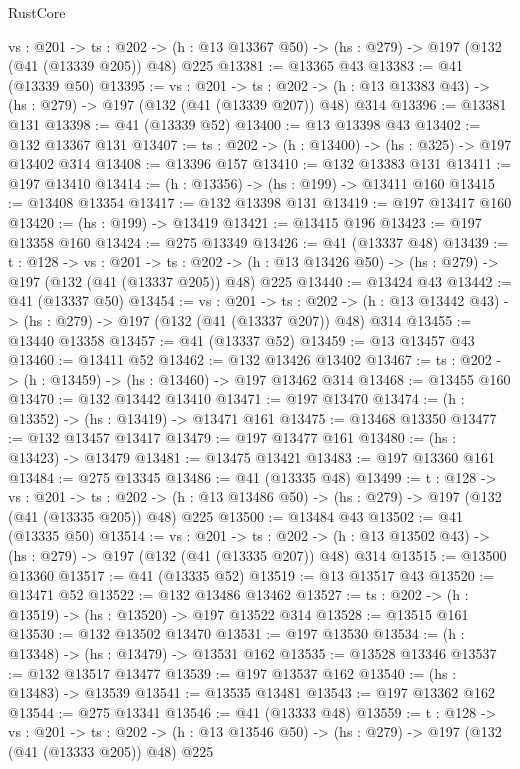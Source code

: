 \begin{lexlean}{RustCore}
\begin{coremodule}
  {vs : @201} ->
  {ts : @202} -> (h : @13 @13367 @50) -> (hs : @279) -> @197 (@132 (@41 (@13339 @205)) @48) @225
@13381 := @13365 @43
@13383 := @41 (@13339 @50)
@13395 := {vs : @201} ->
  {ts : @202} -> (h : @13 @13383 @43) -> (hs : @279) -> @197 (@132 (@41 (@13339 @207)) @48) @314
@13396 := @13381 @131
@13398 := @41 (@13339 @52)
@13400 := @13 @13398 @43
@13402 := @132 @13367 @131
@13407 := {ts : @202} -> (h : @13400) -> (hs : @325) -> @197 @13402 @314
@13408 := @13396 @157
@13410 := @132 @13383 @131
@13411 := @197 @13410
@13414 := (h : @13356) -> (hs : @199) -> @13411 @160
@13415 := @13408 @13354
@13417 := @132 @13398 @131
@13419 := @197 @13417 @160
@13420 := (hs : @199) -> @13419
@13421 := @13415 @196
@13423 := @197 @13358 @160
@13424 := @275 @13349
@13426 := @41 (@13337 @48)
@13439 := {t : @128} ->
  {vs : @201} ->
  {ts : @202} -> (h : @13 @13426 @50) -> (hs : @279) -> @197 (@132 (@41 (@13337 @205)) @48) @225
@13440 := @13424 @43
@13442 := @41 (@13337 @50)
@13454 := {vs : @201} ->
  {ts : @202} -> (h : @13 @13442 @43) -> (hs : @279) -> @197 (@132 (@41 (@13337 @207)) @48) @314
@13455 := @13440 @13358
@13457 := @41 (@13337 @52)
@13459 := @13 @13457 @43
@13460 := @13411 @52
@13462 := @132 @13426 @13402
@13467 := {ts : @202} -> (h : @13459) -> (hs : @13460) -> @197 @13462 @314
@13468 := @13455 @160
@13470 := @132 @13442 @13410
@13471 := @197 @13470
@13474 := (h : @13352) -> (hs : @13419) -> @13471 @161
@13475 := @13468 @13350
@13477 := @132 @13457 @13417
@13479 := @197 @13477 @161
@13480 := (hs : @13423) -> @13479
@13481 := @13475 @13421
@13483 := @197 @13360 @161
@13484 := @275 @13345
@13486 := @41 (@13335 @48)
@13499 := {t : @128} ->
  {vs : @201} ->
  {ts : @202} -> (h : @13 @13486 @50) -> (hs : @279) -> @197 (@132 (@41 (@13335 @205)) @48) @225
@13500 := @13484 @43
@13502 := @41 (@13335 @50)
@13514 := {vs : @201} ->
  {ts : @202} -> (h : @13 @13502 @43) -> (hs : @279) -> @197 (@132 (@41 (@13335 @207)) @48) @314
@13515 := @13500 @13360
@13517 := @41 (@13335 @52)
@13519 := @13 @13517 @43
@13520 := @13471 @52
@13522 := @132 @13486 @13462
@13527 := {ts : @202} -> (h : @13519) -> (hs : @13520) -> @197 @13522 @314
@13528 := @13515 @161
@13530 := @132 @13502 @13470
@13531 := @197 @13530
@13534 := (h : @13348) -> (hs : @13479) -> @13531 @162
@13535 := @13528 @13346
@13537 := @132 @13517 @13477
@13539 := @197 @13537 @162
@13540 := (hs : @13483) -> @13539
@13541 := @13535 @13481
@13543 := @197 @13362 @162
@13544 := @275 @13341
@13546 := @41 (@13333 @48)
@13559 := {t : @128} ->
  {vs : @201} ->
  {ts : @202} -> (h : @13 @13546 @50) -> (hs : @279) -> @197 (@132 (@41 (@13333 @205)) @48) @225

\end{coremodule}
\end{lexlean}
